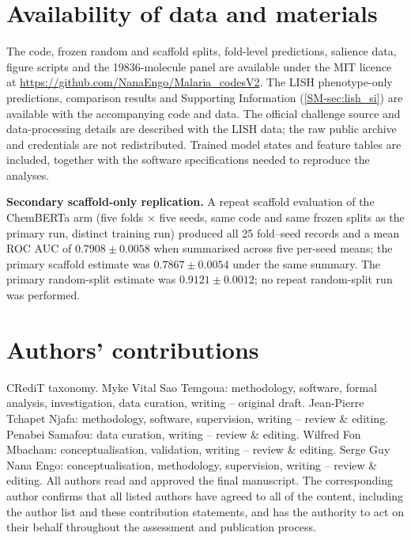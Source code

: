 \documentclass[11pt,a4paper]{article}
\begin{document}
\section*{Availability of data and materials}

The code, frozen random and scaffold splits, fold-level predictions, salience data, figure scripts and the \num{19836}-molecule panel are available under the MIT licence at \url{https://github.com/NanaEngo/Malaria_codesV2}. The LISH phenotype-only predictions, comparison results and Supporting Information (\cref{SM-sec:lish_si}) are available with the accompanying code and data. The official challenge source and data-processing details are described with the LISH data; the raw public archive and credentials are not redistributed. Trained model states and feature tables are included, together with the software specifications needed to reproduce the analyses.

\noindent\textbf{Secondary scaffold-only replication.} A repeat scaffold evaluation of the ChemBERTa arm (five folds $\times$ five seeds, same code and same frozen splits as the primary run, distinct training run) produced all \num{25} fold--seed records and a mean ROC AUC of $\num{0.7908} \pm \num{0.0058}$ when summarised across five per-seed means; the primary scaffold estimate was $\num{0.7867} \pm \num{0.0054}$ under the same summary. The primary random-split estimate was $\num{0.9121} \pm \num{0.0012}$; no repeat random-split run was performed.

\section*{Authors' contributions}

CRediT taxonomy. Myke Vital Sao Temgoua: methodology, software, formal analysis, investigation, data curation, writing -- original draft. Jean-Pierre Tchapet Njafa: methodology, software, supervision, writing -- review \& editing. Penabei Samafou: data curation, writing -- review \& editing. Wilfred Fon Mbacham: conceptualisation, validation, writing -- review \& editing. Serge Guy Nana Engo: conceptualisation, methodology, supervision, writing -- review \& editing. All authors read and approved the final manuscript. The corresponding author confirms that all listed authors have agreed to all of the content, including the author list and these contribution statements, and has the authority to act on their behalf throughout the assessment and publication process.
\end{document}
